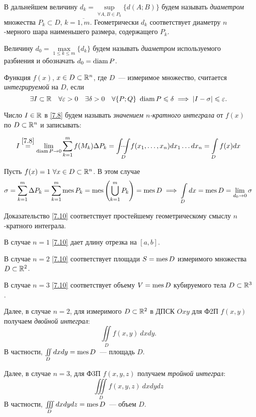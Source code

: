 \documentclass[../../main.tex]{subfiles}
\begin{document}
В дальнейшем величину $d_k = \underset{\forall A, B \in 
P_k}\sup \{d(A; B)\}$
будем называть \emph{диаметром} множества $P_k \subset 
D$, $k = \overline{1, m}$. 
Геометрически $d_k$ соответствует диаметру $n$-мерного шара
наименьшего размера, содержащего $P_k$.

Величину ${d_0 = \underset{1 \le k \le m}\max \{d_k\}}$ 
будем называть \emph{диаметром} используемого разбиения и
обозначать $d_0 = \operatorname{diam} P$.

Функция $f(x)$, $x \in D \subset \mathbb{R}^n$, где $D$~--- измеримое
множество, считается \emph{интегрируемой} на $D$, если
\begin{equation}
\label{7.8}
\exists I \subset \R \quad
\forall \eps > 0 \quad \exists \delta > 0 \quad 
\forall \{P; Q\} \ 
\diam P \le \delta \implies \abs{I  - \sigma} \le \eps.
\end{equation}

Число $ I \in \mathbb{R} $ в \eqref{7.8}
будем называть \emph{значением $n$-кратного интеграла} от 
$f(x)$ по $D \subset \mathbb{R}^n$ и записывать:

\begin{equation}
	I \stk{7.8} = \lim_{\diam P\to 0} \sum_{k=1}^m f(M_k) \Delta P_k
	= \underset{D}{\idotsint} f(x_1, \ldots, x_n) d x_1 \ldots dx_n =
	 \int\limits_{D}f(x)dx
\end{equation}


\begin{example}
	Пусть $f(x) = 1\ \forall x \in D \subset \mathbb{R}^n$. В этом случае
	\begin{equation}
	\label{7.10}
	\sigma = \sum\limits_{k = 1}^m\Delta{P_k} = 
	\sum\limits_{k=1}^m \operatorname{mes} P_k =
	\operatorname{mes}\left(\bigcup\limits_{k = 1}^m P_k\right) = \operatorname{mes} D
	\implies \int\limits_D dx = \operatorname{mes} D = \lim\limits_{d_0 \to 0} \sigma
	\end{equation}
	
	Доказательство \eqref{7.10} соответствует 
	простейшему геометрическому смыслу $n$-кратного 
	интеграла.
	
	В случае $n = 1$ \eqref{7.10} дает длину отрезка на $[a, b]$.
	
	В случае $n = 2$ \eqref{7.10} соответствует площади $S = \operatorname{mes} D$ 
	измеримого множества $D \subset \mathbb{R}^2$.
	
	В случае $n = 3$ \eqref{7.10} соответствует объему $V = \operatorname{mes} D$
	кубируемого тела $D \subset \mathbb{R}^3$.
	
	Далее, в случае $n=2$, для измеримого $D \subset \mathbb{R}^2$ в ДПСК 
	$Oxy$ для Ф2П $f(x, y)$ получаем \emph{двойной интеграл}:
	\[
		\iint\limits_D f(x, y)\:dxdy.
	\]
	В частности, $\iint\limits_D dxdy = \operatorname{mes} D$~--- площадь $D$.
	
	Далее, в случае $n=3$, для Ф3П $f(x, y, z)$ получаем 
	\emph{тройной интеграл}:
	\[
	\iiint\limits_D f(x,y,z)\:dxdydz
	\]
	В частности, $\iiint\limits_D dxdydz = \operatorname{mes} D$~--- объем $D$.
\end{example}
\end{document}
